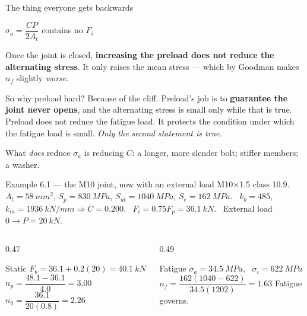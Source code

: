 \documentclass[aspectratio=169,10pt]{beamer}
\begin{document}
\begin{frame}{The thing everyone gets backwards}
\begin{center}\Large
$\sigma_a = \dfrac{CP}{2A_t}$ \qquad \alert{contains no $F_i$}
\end{center}
\vfill
Once the joint is closed, \textbf{increasing the preload does not reduce the alternating stress}.
It only raises the mean stress --- which by Goodman makes $n_f$ slightly \emph{worse}.
\vfill
\begin{alertblock}{So why preload hard?}
Because of the cliff. Preload's job is to \textbf{guarantee the joint never opens}, and the
alternating stress is small only while that is true.
\vspace{2pt}
Preload does not reduce the fatigue load. It protects the condition under which the fatigue load is
small. \emph{Only the second statement is true.}
\end{alertblock}
\vfill
\centering
What \emph{does} reduce $\sigma_a$ is reducing $C$: a longer, more slender bolt; stiffer members; a washer.
\end{frame}

\begin{frame}{Example 6.1 --- the M10 joint, now with an external load}
M10$\times$1.5 class 10.9. $A_t=\SI{58}{mm^2}$, $S_p=\SI{830}{MPa}$, $S_{ut}=\SI{1040}{MPa}$,
$S_e=\SI{162}{MPa}$. \ $k_b=485$, $k_m=\SI{1936}{kN/mm} \Rightarrow C=0.200$.
\ $F_i=0.75F_p=\SI{36.1}{kN}$. \ External load $0\to P=\SI{20}{kN}$.
\vfill
\begin{columns}[T]
\begin{column}{0.47\textwidth}
\begin{block}{Static}
$F_b = 36.1+0.2(20)=\SI{40.1}{kN}$
\vspace{2pt}
$n_p=\dfrac{48.1-36.1}{4.0}=\mathbf{3.00}$
\vspace{2pt}
$n_0=\dfrac{36.1}{20(0.8)}=\mathbf{2.26}$
\end{block}
\end{column}
\begin{column}{0.49\textwidth}
\begin{block}{Fatigue}
$\sigma_a=\SI{34.5}{MPa}$, \ $\sigma_i=\SI{622}{MPa}$
\vspace{2pt}
$n_f=\dfrac{162(1040-622)}{34.5(1202)}=\mathbf{1.63}$
\vspace{2pt}
\alert{Fatigue governs.}
\end{block}
\end{column}
\end{columns}
\end{frame}
\end{document}
